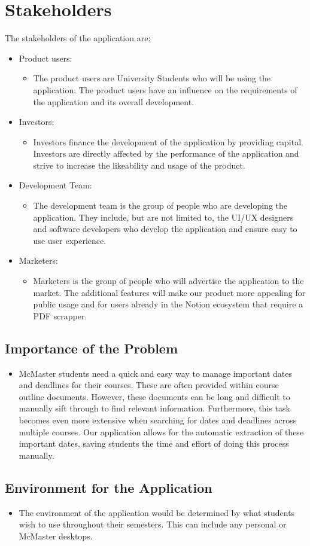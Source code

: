 \documentclass[12pt, titlepage]{article}
\begin{document}
\section{Stakeholders}
\quad \quad The stakeholders of the application are:
\begin{itemize}
  \item Product users:
  \begin{itemize}
      \item[] The product users are University Students who will be using the application. The product users have an influence on the requirements of the application and its overall development.
  \end{itemize}
  \item Investors:
  \begin{itemize}
      \item[] Investors finance the development of the application by providing capital. Investors are directly affected by the performance of the application and strive to increase the likeability and usage of the product.
  \end{itemize}
  \item Development Team:
  \begin{itemize}
      \item[] The development team is the group of people who are developing the application. They include, but are not limited to, the UI/UX designers and software developers who develop the application and ensure easy to use user experience.
  \end{itemize}
  \item {Marketers:}
  \begin{itemize}
      \item[] Marketers is the group of people who will advertise the application to the market. The additional features will make our product more appealing for public usage and for users already in the Notion ecosystem that require a PDF scrapper.
  \end{itemize}
\end{itemize}

\subsection{Importance of the Problem}
\begin{itemize}
    \item[]
    McMaster students need a quick and easy way to manage important dates and deadlines for their courses. These are often provided within course outline documents. However, these documents can be long and difficult to manually sift through to find relevant information. Furthermore, this task becomes even more extensive when searching for dates and deadlines across multiple courses. Our application allows for the automatic extraction of these important dates, saving students the time and effort of doing this process manually.
\end{itemize}

\subsection{Environment for the Application}
\begin{itemize}
    \item[]
    The environment of the application would be determined by what students wish to use throughout their semesters. This can include any personal or McMaster desktops. 
\end{itemize}
\end{document}

